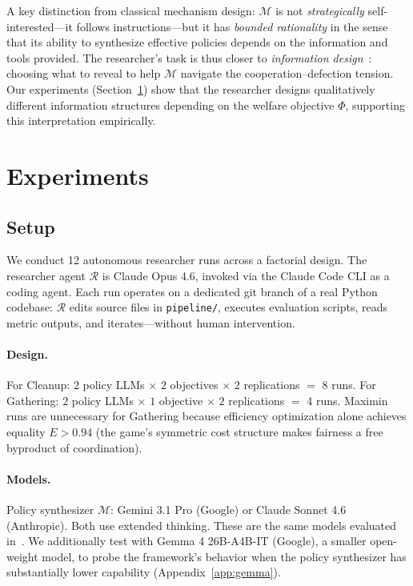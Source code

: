 \documentclass[10pt,twocolumn]{article}
\newcommand{\cR}{\mathcal{R}}
\newcommand{\cM}{\mathcal{M}}
\begin{document}
A key distinction from classical mechanism design: $\cM$ is not \emph{strategically} self-interested---it follows instructions---but it has \emph{bounded rationality} in the sense that its ability to synthesize effective policies depends on the information and tools provided. The researcher's task is thus closer to \emph{information design}~\cite{kamenica2011}: choosing what to reveal to help $\cM$ navigate the cooperation--defection tension. Our experiments (Section~\ref{sec:experiments}) show that the researcher designs qualitatively different information structures depending on the welfare objective $\Phi$, supporting this interpretation empirically.

\section{Experiments}
\label{sec:experiments}

\subsection{Setup}

We conduct 12 autonomous researcher runs across a factorial design. The researcher agent $\cR$ is Claude Opus 4.6, invoked via the Claude Code CLI as a coding agent. Each run operates on a dedicated git branch of a real Python codebase: $\cR$ edits source files in \texttt{pipeline/}, executes evaluation scripts, reads metric outputs, and iterates---without human intervention.

\paragraph{Design.}
For Cleanup: $2$ policy LLMs $\times$ $2$ objectives $\times$ $2$ replications $=$ 8 runs. For Gathering: $2$ policy LLMs $\times$ $1$ objective $\times$ $2$ replications $=$ 4 runs. Maximin runs are unnecessary for Gathering because efficiency optimization alone achieves equality $E > 0.94$ (the game's symmetric cost structure makes fairness a free byproduct of coordination).

\paragraph{Models.}
Policy synthesizer $\cM$: Gemini 3.1 Pro (Google) or Claude Sonnet 4.6 (Anthropic). Both use extended thinking. These are the same models evaluated in~\cite{gallego2026}. We additionally test with Gemma 4 26B-A4B-IT (Google), a smaller open-weight model, to probe the framework's behavior when the policy synthesizer has substantially lower capability (Appendix~\ref{app:gemma}).
\end{document}
